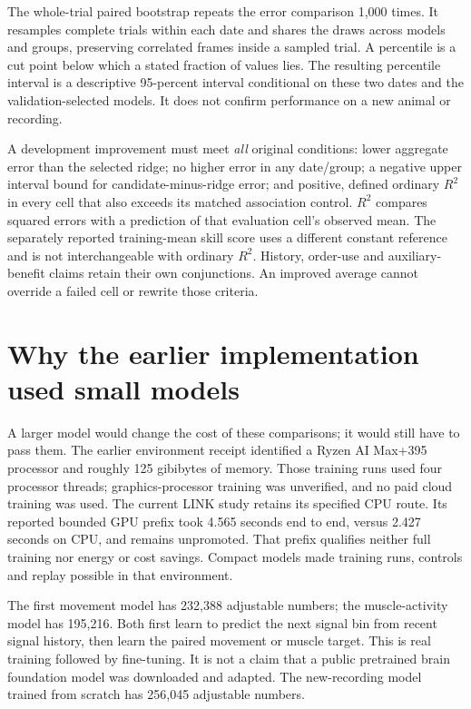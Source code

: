 The whole-trial paired bootstrap repeats the error comparison 1,000 times. It resamples complete trials within each date and shares the draws across models and groups, preserving correlated frames inside a sampled trial. A percentile is a cut point below which a stated fraction of values lies. The resulting percentile interval is a descriptive 95-percent interval conditional on these two dates and the validation-selected models. It does not confirm performance on a new animal or recording.

A development improvement must meet \emph{all} original conditions: lower
aggregate error than the selected ridge; no higher error in any date/group;
a negative upper interval bound for candidate-minus-ridge error; and positive,
defined ordinary $R^2$ in every cell that also exceeds its matched association
control. $R^2$ compares squared errors with a prediction of that evaluation
cell's observed mean. The separately reported training-mean skill score uses
a different constant reference and is not interchangeable with ordinary $R^2$.
History, order-use and auxiliary-benefit claims retain their own conjunctions.
An improved average cannot override a failed cell or rewrite those criteria.


\section{Why the earlier implementation used small models}

A larger model would change the cost of these comparisons; it would still have to pass them. The earlier environment receipt identified a Ryzen AI Max+395 processor and roughly 125 gibibytes of memory. Those training runs used four processor threads; graphics-processor training was unverified, and no paid cloud training was used. The current LINK study retains its specified CPU route. Its reported bounded GPU prefix took 4.565 seconds end to end, versus 2.427 seconds on CPU, and remains unpromoted. That prefix qualifies neither full training nor energy or cost savings. Compact models made training runs, controls and replay possible in that environment.

The first movement model has 232,388 adjustable numbers; the muscle-activity
model has 195,216. Both first learn to predict the next signal bin from recent
signal history, then learn the paired movement or muscle target. This is real
training followed by fine-tuning. It is not a claim that a public pretrained
brain foundation model was downloaded and adapted. The new-recording model
trained from scratch has 256,045 adjustable numbers.

